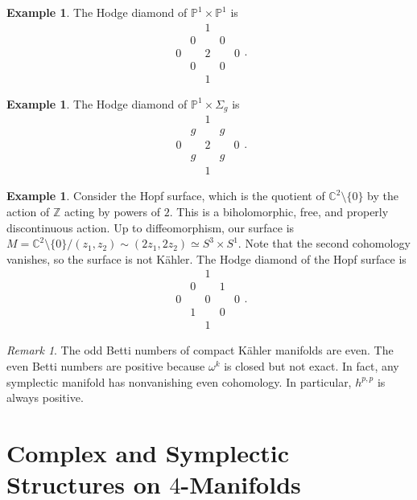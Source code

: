 \documentclass[leqno, openany]{memoir}
\theoremstyle{definition}
\newtheorem{exm}[thm]{Example}
\theoremstyle{remark}
\newtheorem{rmk}[thm]{Remark}
\theoremstyle{plain}
\theoremstyle{definition}
\theoremstyle{remark}
\newcommand{\C}{\mathbb{C}}
\newcommand{\Z}{\mathbb{Z}}
\renewcommand{\P}{\mathbb{P}}
\begin{document}
\begin{exm} The Hodge diamond of $\P^1 \times \P^1$ is \[ \begin{array}{ccccc}
& & 1 & & \\ & 0 & & 0 & \\ 0 & & 2 & & 0 \\ & 0 & & 0 & \\ & & 1 & &
\end{array}.\] \end{exm}

\begin{exm} The Hodge diamond of $\P^1 \times \Sigma_g$ is \[
    \begin{array}{ccccc} & & 1 & & \\ & g & & g & \\ 0 & & 2 & & 0 \\ & g & & g
    & \\ & & 1 & & \end{array}.\] \end{exm}

\begin{exm} Consider the Hopf surface, which is the quotient of $\C^2 \setminus
    \{0\}$ by the action of $\Z$ acting by powers of $2$. This is a
    biholomorphic, free, and properly discontinuous action. Up to
    diffeomorphism, our surface is $M = \C^2 \setminus \{0\} / (z_1,z_2) \sim
    (2z_1, 2z_2) \simeq S^3 \times S^1$. Note that the second cohomology
    vanishes, so the surface is not K\"ahler. The Hodge diamond of the Hopf
    surface is \[ \begin{array}{ccccc} & & 1 & & \\ & 0 & & 1 & \\ 0 & & 0 & &
    0 \\ & 1 & & 0 & \\ & & 1 & & \end{array}.\] \end{exm}

\begin{rmk} The odd Betti numbers of compact K\"ahler manifolds are even. The
    even Betti numbers are positive because $\omega^k$ is closed but not exact.
    In fact, any symplectic manifold has nonvanishing even cohomology. In
    particular, $h^{p,p}$ is always positive.  \end{rmk}

\section{Complex and Symplectic Structures on $4$-Manifolds}%
\label{sec:topology_of_complex_surfaces}
\end{document}

